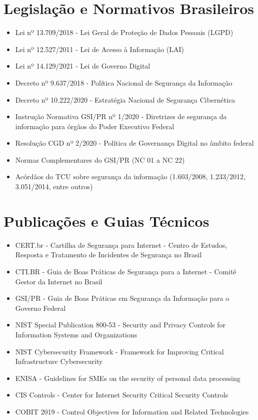 \documentclass[12pt,a4paper]{report}
\begin{document}
\section{Legislação e Normativos Brasileiros}

\begin{itemize}
  \item Lei nº 13.709/2018 - Lei Geral de Proteção de Dados Pessoais (LGPD)
  \item Lei nº 12.527/2011 - Lei de Acesso à Informação (LAI)
  \item Lei nº 14.129/2021 - Lei de Governo Digital
  \item Decreto nº 9.637/2018 - Política Nacional de Segurança da Informação
  \item Decreto nº 10.222/2020 - Estratégia Nacional de Segurança Cibernética
  \item Instrução Normativa GSI/PR nº 1/2020 - Diretrizes de segurança da informação para órgãos do Poder Executivo Federal
  \item Resolução CGD nº 2/2020 - Política de Governança Digital no âmbito federal
  \item Normas Complementares do GSI/PR (NC 01 a NC 22)
  \item Acórdãos do TCU sobre segurança da informação (1.603/2008, 1.233/2012, 3.051/2014, entre outros)
\end{itemize}

\section{Publicações e Guias Técnicos}

\begin{itemize}
  \item CERT.br - Cartilha de Segurança para Internet - Centro de Estudos, Resposta e Tratamento de Incidentes de Segurança no Brasil
  \item CTI.BR - Guia de Boas Práticas de Segurança para a Internet - Comitê Gestor da Internet no Brasil
  \item GSI/PR - Guia de Boas Práticas em Segurança da Informação para o Governo Federal
  \item NIST Special Publication 800-53 - Security and Privacy Controls for Information Systems and Organizations
  \item NIST Cybersecurity Framework - Framework for Improving Critical Infrastructure Cybersecurity
  \item ENISA - Guidelines for SMEs on the security of personal data processing
  \item CIS Controls - Center for Internet Security Critical Security Controls
  \item COBIT 2019 - Control Objectives for Information and Related Technologies
\end{itemize}
\end{document}
